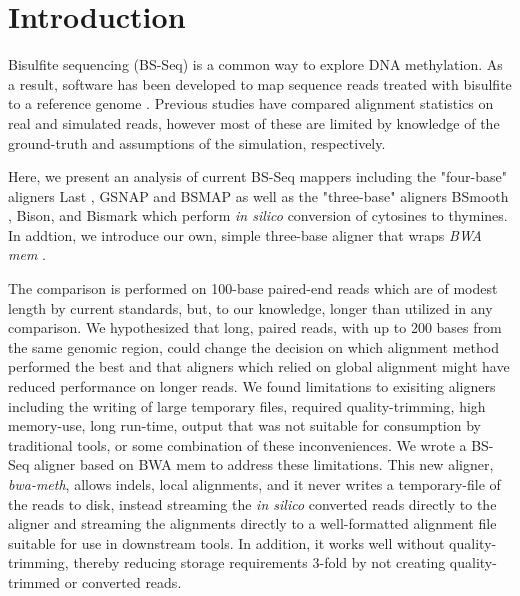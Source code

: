\documentclass{bioinfo}
\begin{document}
\section{Introduction}
Bisulfite sequencing (BS-Seq) is a common way to explore DNA methylation.
As a result, software 
has been developed to map sequence reads treated with bisulfite to a reference genome \citep{frithlast,methylcoder,gsnap,krueger2011,bsmap,bsmooth}.
Previous studies have compared alignment statistics on 
real \citep{methylcoder,bsmap,shrestha} and simulated \citep{frithlast} reads,
however most of these are limited by knowledge of the ground-truth and assumptions of
the simulation, respectively.

Here, we present an analysis of current BS-Seq mappers including the "four-base" aligners
Last \citep{frithlast}, GSNAP \citep{gsnap} and BSMAP \citep{bsmap} as well as the
"three-base" aligners BSmooth \citep{bsmooth}, Bison, and Bismark \citep{krueger2011} which
perform \emph{in silico} conversion of cytosines to thymines. In addtion, we introduce our
own, simple three-base aligner that wraps \textit{BWA mem} \citep{bwamem}.

The comparison is performed on 100-base paired-end reads
which are of modest length by current standards, but, to our knowledge, longer than
utilized in any comparison. We hypothesized that long, paired reads, with up
to 200 bases from the same genomic region, could change the decision on which
alignment method performed the best and that aligners which relied on global
alignment might have reduced performance on longer reads.
We found limitations to exisiting aligners including the writing of large temporary
files, required quality-trimming, high memory-use, long run-time, output that was not
suitable for consumption by traditional tools, or some combination of these
inconveniences. We wrote
a BS-Seq aligner based on BWA mem \citep{bwamem} to address these
limitations. This new aligner, 
\textit{bwa-meth}, allows indels, local alignments, and it never writes a
temporary-file of the reads to disk, instead streaming the \emph{in silico} converted
reads directly to the aligner and streaming the alignments directly to a well-formatted
alignment file suitable for use in downstream tools. In addition, it works well without
quality-trimming, thereby reducing storage requirements 3-fold by not creating
quality-trimmed or converted reads.
\end{document}
